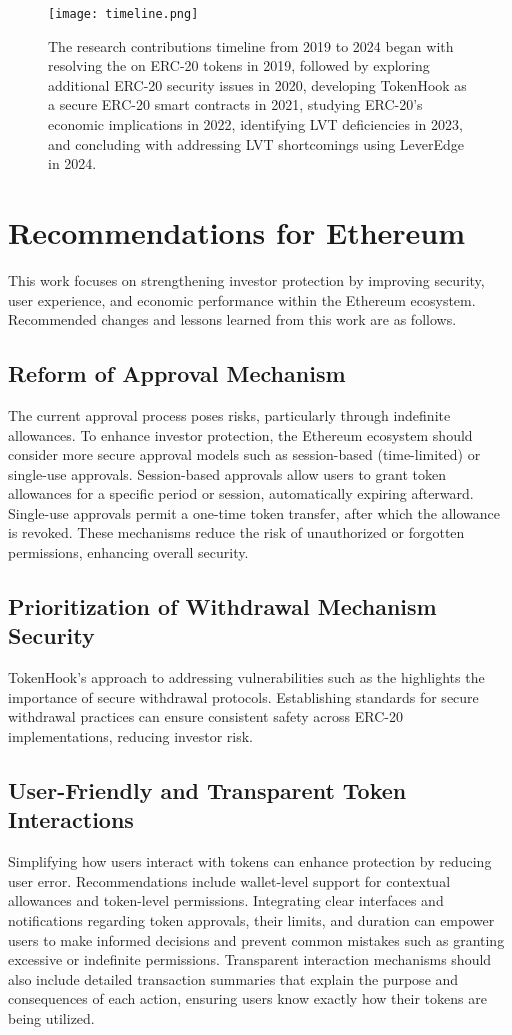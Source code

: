 \begin{figure}[t]
	\centering
	\texttt{[image: timeline.png]}
	\caption[Research contributions timeline]{The research contributions timeline from 2019 to 2024 began with resolving the \mwa on ERC-20 tokens in 2019, followed by exploring additional ERC-20 security issues in 2020, developing TokenHook as a secure ERC-20 smart contracts in 2021, studying ERC-20's economic implications in 2022, identifying LVT deficiencies in 2023, and concluding with addressing LVT shortcomings using LeverEdge in 2024.}
	\label{fig:timeline}
\end{figure}

\section{Recommendations for Ethereum}
This work focuses on strengthening investor protection by improving security, user experience, and economic performance within the Ethereum ecosystem. Recommended changes and lessons learned from this work are as follows. 

\subsection{Reform of Approval Mechanism}
The current approval process poses risks, particularly through indefinite allowances. To enhance investor protection, the Ethereum ecosystem should consider more secure approval models such as session-based (time-limited) or single-use approvals. Session-based approvals allow users to grant token allowances for a specific period or session, automatically expiring afterward. Single-use approvals permit a one-time token transfer, after which the allowance is revoked. These mechanisms reduce the risk of unauthorized or forgotten permissions, enhancing overall security.

\subsection{Prioritization of Withdrawal Mechanism Security}
TokenHook's approach to addressing vulnerabilities such as the \mwa highlights the importance of secure withdrawal protocols. Establishing standards for secure withdrawal practices can ensure consistent safety across ERC-20 implementations, reducing investor risk.

\subsection{User-Friendly and Transparent Token Interactions}
Simplifying how users interact with tokens can enhance protection by reducing user error. Recommendations include wallet-level support for contextual allowances and token-level permissions. Integrating clear interfaces and notifications regarding token approvals, their limits, and duration can empower users to make informed decisions and prevent common mistakes such as granting excessive or indefinite permissions. Transparent interaction mechanisms should also include detailed transaction summaries that explain the purpose and consequences of each action, ensuring users know exactly how their tokens are being utilized. 

